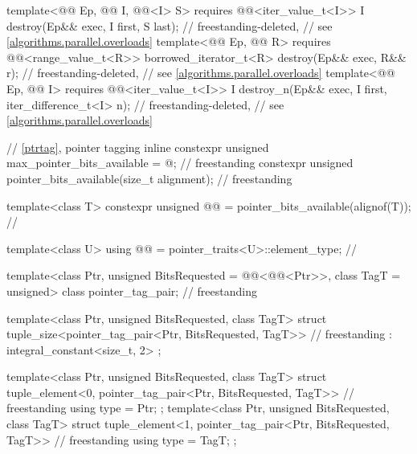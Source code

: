 \begin{codeblock}
{{    template<@@ Ep, @@ I,
             @@<I> S>
      requires @@<iter_value_t<I>>
        I destroy(Ep&& exec, I first, S last);                              // freestanding-deleted,
                                                                            // see \ref{algorithms.parallel.overloads}
    template<@@ Ep, @@ R>
      requires @@<range_value_t<R>>
        borrowed_iterator_t<R> destroy(Ep&& exec, R&& r);                   // freestanding-deleted,
                                                                            // see \ref{algorithms.parallel.overloads}
    template<@@ Ep, @@ I>
      requires @@<iter_value_t<I>>
        I destroy_n(Ep&& exec, I first, iter_difference_t<I> n);            // freestanding-deleted,
                                                                            // see \ref{algorithms.parallel.overloads}
  }

  // \ref{ptrtag}, pointer tagging
  inline constexpr unsigned max_pointer_bits_available = @\seebelownc@;                 // freestanding
  constexpr unsigned pointer_bits_available(size_t alignment);                      // freestanding

  template<class T>
    constexpr unsigned @@ = pointer_bits_available(alignof(T));     // \expos

  template<class U> using @@ = pointer_traits<U>::element_type;         // \expos

  template<class Ptr, unsigned BitsRequested = @@<@@<Ptr>>,
           class TagT = unsigned>
    class pointer_tag_pair;                                                         // freestanding

  template<class Ptr, unsigned BitsRequested, class TagT>
    struct tuple_size<pointer_tag_pair<Ptr, BitsRequested, TagT>>                   // freestanding
      : integral_constant<size_t, 2> { };

  template<class Ptr, unsigned BitsRequested, class TagT>
    struct tuple_element<0, pointer_tag_pair<Ptr, BitsRequested, TagT>> {           // freestanding
      using type = Ptr;
    };
  template<class Ptr, unsigned BitsRequested, class TagT>
    struct tuple_element<1, pointer_tag_pair<Ptr, BitsRequested, TagT>> {           // freestanding
      using type = TagT;
    };

}
\end{codeblock}
